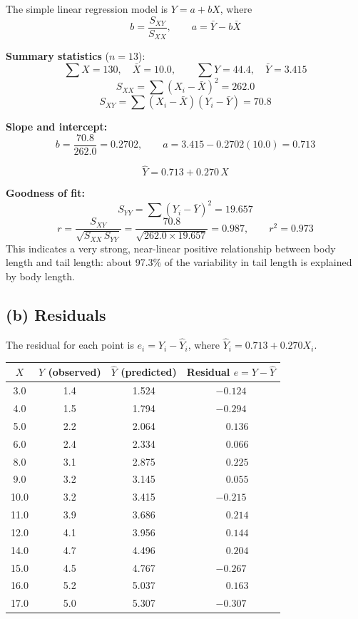 \documentclass[11pt]{article}
\begin{document}
The simple linear regression model is $Y = a + bX$, where
\[
b = \frac{S_{XY}}{S_{XX}}, \qquad a = \bar{Y} - b\bar{X}
\]

\textbf{Summary statistics} ($n=13$):
\[
\sum X = 130, \quad \bar{X} = 10.0, \qquad \sum Y = 44.4, \quad \bar{Y} = 3.415
\]
\[
S_{XX} = \sum (X_i-\bar{X})^2 = 262.0
\]
\[
S_{XY} = \sum (X_i-\bar{X})(Y_i-\bar{Y}) = 70.8
\]

\textbf{Slope and intercept:}
\[
b = \frac{70.8}{262.0} = 0.2702, \qquad a = 3.415 - 0.2702(10.0) = 0.713
\]

\[
\boxed{\hat{Y} = 0.713 + 0.270\, X}
\]

\textbf{Goodness of fit:}
\[
S_{YY} = \sum(Y_i-\bar{Y})^2 = 19.657
\]
\[
r = \frac{S_{XY}}{\sqrt{S_{XX}\,S_{YY}}} = \frac{70.8}{\sqrt{262.0\times19.657}} = 0.987, \qquad r^2 = 0.973
\]
This indicates a very strong, near-linear positive relationship between body length and tail length: about 97.3\% of the variability in tail length is explained by body length.

\subsection*{(b) Residuals}

The residual for each point is $e_i = Y_i - \hat{Y}_i$, where $\hat{Y}_i = 0.713+0.270X_i$.

\begin{center}
\begin{tabular}{cccc}
\toprule
$X$ & $Y$ (observed) & $\hat{Y}$ (predicted) & Residual $e = Y-\hat{Y}$ \\
\midrule
3.0  & 1.4 & 1.524 & $-0.124$ \\
4.0  & 1.5 & 1.794 & $-0.294$ \\
5.0  & 2.2 & 2.064 & $\phantom{-}0.136$ \\
6.0  & 2.4 & 2.334 & $\phantom{-}0.066$ \\
8.0  & 3.1 & 2.875 & $\phantom{-}0.225$ \\
9.0  & 3.2 & 3.145 & $\phantom{-}0.055$ \\
10.0 & 3.2 & 3.415 & $-0.215$ \\
11.0 & 3.9 & 3.686 & $\phantom{-}0.214$ \\
12.0 & 4.1 & 3.956 & $\phantom{-}0.144$ \\
14.0 & 4.7 & 4.496 & $\phantom{-}0.204$ \\
15.0 & 4.5 & 4.767 & $-0.267$ \\
16.0 & 5.2 & 5.037 & $\phantom{-}0.163$ \\
17.0 & 5.0 & 5.307 & $-0.307$ \\
\bottomrule
\end{tabular}
\end{center}
\end{document}
